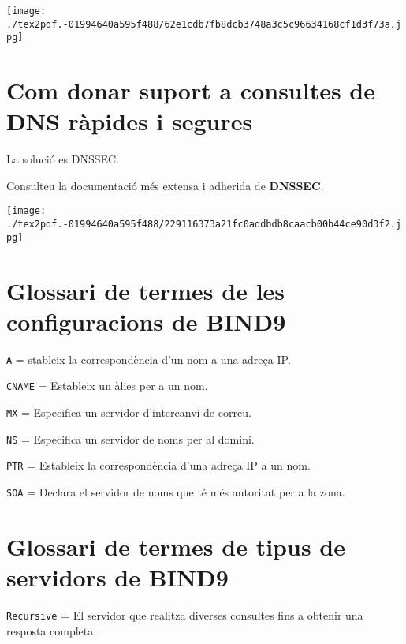 \documentclass[]{article}
\begin{document}
\texttt{[image: ./tex2pdf.-01994640a595f488/62e1cdb7fb8dcb3748a3c5c96634168cf1d3f73a.jpg]}

\hypertarget{com-donar-suport-a-consultes-de-dns-ruxe0pides-i-segures}{%
\section{\texorpdfstring{\textbf{Com donar suport a consultes de DNS
ràpides i
segures}}{Com donar suport a consultes de DNS ràpides i segures}}\label{com-donar-suport-a-consultes-de-dns-ruxe0pides-i-segures}}

La solució es DNSSEC.

Consulteu la documentació més extensa i adherida de \textbf{DNSSEC}.

\texttt{[image: ./tex2pdf.-01994640a595f488/229116373a21fc0addbdb8caacb00b44ce90d3f2.jpg]}

\hypertarget{glossari-de-termes-de-les-configuracions-de-bind9}{%
\section{\texorpdfstring{\textbf{Glossari de termes de les
configuracions de
BIND9}}{Glossari de termes de les configuracions de BIND9}}\label{glossari-de-termes-de-les-configuracions-de-bind9}}

\texttt{A} = stableix la correspondència d'un nom a una adreça IP.

\texttt{CNAME} = Estableix un àlies per a un nom.

\texttt{MX} = Especifica un servidor d'intercanvi de correu.

\texttt{NS} = Especifica un servidor de noms per al domini.

\texttt{PTR} = Estableix la correspondència d'una adreça IP a un nom.

\texttt{SOA} = Declara el servidor de noms que té més autoritat per a la
zona.

\hypertarget{glossari-de-termes-de-tipus-de-servidors-de-bind9}{%
\section{\texorpdfstring{\textbf{Glossari de termes de tipus de
servidors de
BIND9}}{Glossari de termes de tipus de servidors de BIND9}}\label{glossari-de-termes-de-tipus-de-servidors-de-bind9}}

\texttt{Recursive} = El servidor que realitza diverses consultes fins a
obtenir una resposta completa.
\end{document}
